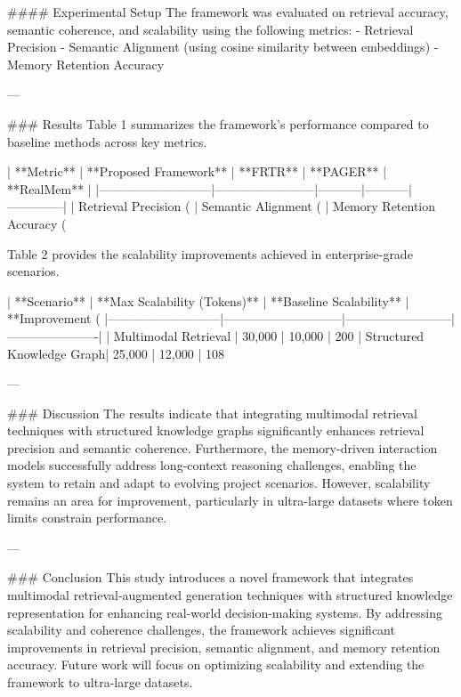 #### Experimental Setup  
The framework was evaluated on retrieval accuracy, semantic coherence, and scalability using the following metrics:  
- Retrieval Precision  
- Semantic Alignment (using cosine similarity between embeddings)  
- Memory Retention Accuracy  

---

### Results  
Table 1 summarizes the framework's performance compared to baseline methods across key metrics.  

| **Metric**               | **Proposed Framework** | **FRTR** | **PAGER** | **RealMem** |  
|---------------------------|------------------------|-----------|-----------|--------------|  
| Retrieval Precision (%
| Semantic Alignment (%
| Memory Retention Accuracy (%

Table 2 provides the scalability improvements achieved in enterprise-grade scenarios.  

| **Scenario**              | **Max Scalability (Tokens)** | **Baseline Scalability** | **Improvement (%
|---------------------------|-----------------------------|--------------------------|----------------------|  
| Multimodal Retrieval      | 30,000                     | 10,000                  | 200%
| Structured Knowledge Graph| 25,000                     | 12,000                  | 108%

---

### Discussion  
The results indicate that integrating multimodal retrieval techniques with structured knowledge graphs significantly enhances retrieval precision and semantic coherence. Furthermore, the memory-driven interaction models successfully address long-context reasoning challenges, enabling the system to retain and adapt to evolving project scenarios. However, scalability remains an area for improvement, particularly in ultra-large datasets where token limits constrain performance.

---

### Conclusion  
This study introduces a novel framework that integrates multimodal retrieval-augmented generation techniques with structured knowledge representation for enhancing real-world decision-making systems. By addressing scalability and coherence challenges, the framework achieves significant improvements in retrieval precision, semantic alignment, and memory retention accuracy. Future work will focus on optimizing scalability and extending the framework to ultra-large datasets.

